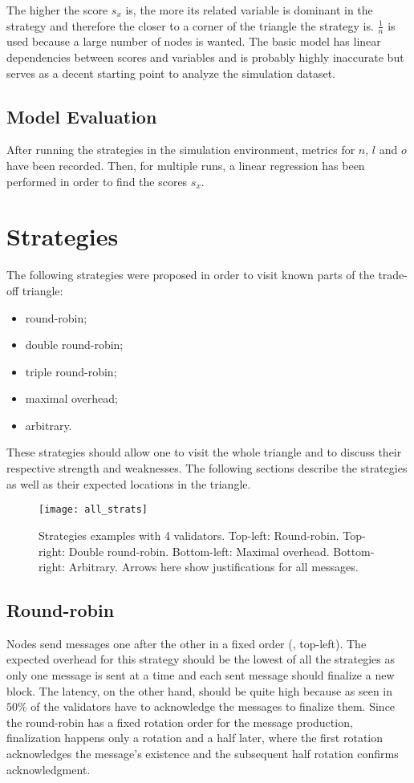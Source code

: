The higher the score \(s_x\) is, the more its related variable is dominant in
the strategy and therefore the closer to a corner of the triangle the strategy
is.  \(\frac{1}{n}\) is used because a large number of nodes is wanted.  The
basic model has linear dependencies between scores and variables and is probably
highly inaccurate but serves as a decent starting point to analyze the
simulation dataset.

\subsection{Model Evaluation}
After running the strategies in the simulation environment, metrics for \(n\),
\(l\) and \(o\) have been recorded. Then, for multiple runs, a linear regression
has been performed in order to find the scores \(s_x\).

\section{Strategies}
\label{sec:strategies}

The following strategies were proposed in order to visit known parts of the
trade-off triangle:
\begin{itemize}
        \item round-robin;
        \item double round-robin;
        \item triple round-robin;
        \item maximal overhead;
        \item arbitrary.
\end{itemize}
These strategies should allow one to visit the whole triangle and to discuss
their respective strength and weaknesses. The following sections describe the
strategies as well as their expected locations in the triangle.

\begin{figure}[h]
	\centering
	\texttt{[image: all\_strats]}
    \caption{Strategies examples with 4 validators. Top-left: Round-robin.
    Top-right: Double round-robin. Bottom-left: Maximal overhead. Bottom-right:
    Arbitrary. Arrows here show justifications for all messages.}
	\label{fig:allStrats}
\end{figure}

\subsection{Round-robin}
Nodes send messages one after the other in a fixed order (,
top-left). The expected overhead for this strategy should be the lowest of all
the strategies as only one message is sent at a time and each sent message
should finalize a new block.  The latency, on the other hand, should be quite
high because as seen in  \(50\%\) of the validators have to
acknowledge the messages to finalize them. Since the round-robin has a fixed
rotation order for the message production, finalization happens only a rotation
and a half later, where the first rotation acknowledges the message's existence
and the subsequent half rotation confirms acknowledgment.

